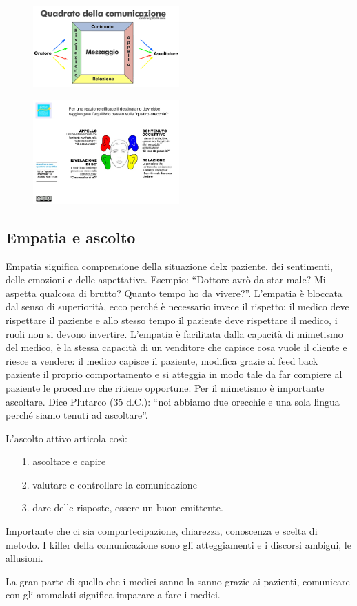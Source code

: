  \begin{figure}[!ht]
\centering
	\includegraphics[width=0.5\textwidth]{31/image1.png}
	\end{figure}

 \begin{figure}[!ht]
\centering
	\includegraphics[width=0.5\textwidth]{31/image2.jpeg}
	\end{figure}

\subsection{Empatia e ascolto}

Empatia significa comprensione della situazione delx paziente, dei
sentimenti, delle emozioni e delle aspettative. Esempio: ``Dottore avrò
da star male? Mi aspetta qualcosa di brutto? Quanto tempo ho da
vivere?''. L'empatia è bloccata dal senso di superiorità, ecco perché è
necessario invece il rispetto: il medico deve rispettare il paziente e
allo stesso tempo il paziente deve rispettare il medico, i ruoli non si
devono invertire. L'empatia è facilitata dalla capacità di mimetismo del
medico, è la stessa capacità di un venditore che capisce cosa vuole il
cliente e riesce a vendere: il medico capisce il paziente, modifica
grazie al feed back paziente il proprio comportamento e si atteggia in
modo tale da far compiere al paziente le procedure che ritiene
opportune. Per il mimetismo è importante ascoltare. Dice Plutarco (35
d.C.): ``noi abbiamo due orecchie e una sola lingua perché siamo tenuti
ad ascoltare''.

L'ascolto attivo articola così:

\begin{itemize}
\item[1.]
  ascoltare e capire
\item[2.]
  valutare e controllare la comunicazione
\item[3.]
  dare delle risposte, essere un buon emittente.
\end{itemize}

Importante che ci sia compartecipazione, chiarezza, conoscenza e scelta
di metodo. I killer della comunicazione sono gli atteggiamenti e i
discorsi ambigui, le allusioni.

La gran parte di quello che i medici sanno la sanno grazie ai pazienti,
comunicare con gli ammalati significa imparare a fare i medici.